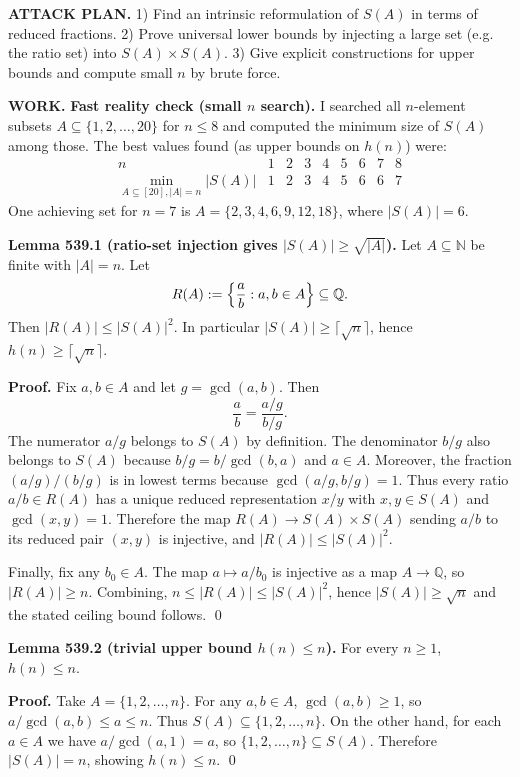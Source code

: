\noindent\textbf{ATTACK PLAN.}
1) Find an intrinsic reformulation of $S(A)$ in terms of reduced fractions.
2) Prove universal lower bounds by injecting a large set (e.g. the ratio set) into $S(A)\times S(A)$.
3) Give explicit constructions for upper bounds and compute small $n$ by brute force.

\noindent\textbf{WORK.}
\textbf{Fast reality check (small $n$ search).}
I searched all $n$-element subsets $A\subseteq\{1,2,\dots,20\}$ for $n\le 8$ and computed the minimum size of $S(A)$ among those.
The best values found (as upper bounds on $h(n)$) were:
\[
\begin{array}{c|cccccccc}
 n&1&2&3&4&5&6&7&8\\\hline
 \min_{A\subseteq[20],|A|=n} |S(A)| & 1&2&3&4&5&6&6&7
\end{array}
\]
One achieving set for $n=7$ is $A=\{2,3,4,6,9,12,18\}$, where $|S(A)|=6$.

\medskip
\textbf{Lemma 539.1 (ratio-set injection gives $|S(A)|\ge \sqrt{|A|}$).}
Let $A\subseteq\mathbb N$ be finite with $|A|=n$.
Let
\[
R(A):=\Bigl\{\frac{a}{b}: a,b\in A\Bigr\}\subseteq\mathbb Q.
\]
Then $|R(A)|\le |S(A)|^2$.
In particular $|S(A)|\ge \lceil\sqrt n\rceil$, hence $h(n)\ge \lceil\sqrt n\rceil$.

\textbf{Proof.}
Fix $a,b\in A$ and let $g=\gcd(a,b)$. Then
\[
\frac{a}{b}=\frac{a/g}{b/g}.
\]
The numerator $a/g$ belongs to $S(A)$ by definition.
The denominator $b/g$ also belongs to $S(A)$ because
\(
 b/g = b/\gcd(b,a)
\)
and $a\in A$.
Moreover, the fraction $(a/g)/(b/g)$ is in lowest terms because $\gcd(a/g,b/g)=1$.
Thus every ratio $a/b\in R(A)$ has a unique reduced representation $x/y$ with $x,y\in S(A)$ and $\gcd(x,y)=1$.
Therefore the map $R(A)\to S(A)\times S(A)$ sending $a/b$ to its reduced pair $(x,y)$ is injective, and
$|R(A)|\le |S(A)|^2$.

Finally, fix any $b_0\in A$. The map $a\mapsto a/b_0$ is injective as a map $A\to\mathbb Q$, so $|R(A)|\ge n$.
Combining, $n\le |R(A)|\le |S(A)|^2$, hence $|S(A)|\ge \sqrt n$ and the stated ceiling bound follows. \qed

\medskip
\textbf{Lemma 539.2 (trivial upper bound $h(n)\le n$).}
For every $n\ge 1$, $h(n)\le n$.

\textbf{Proof.}
Take $A=\{1,2,\dots,n\}$. For any $a,b\in A$, $\gcd(a,b)\ge 1$, so
\(
 a/\gcd(a,b)\le a\le n.
\)
Thus $S(A)\subseteq\{1,2,\dots,n\}$.
On the other hand, for each $a\in A$ we have $a/\gcd(a,1)=a$, so $\{1,2,\dots,n\}\subseteq S(A)$.
Therefore $|S(A)|=n$, showing $h(n)\le n$. \qed

